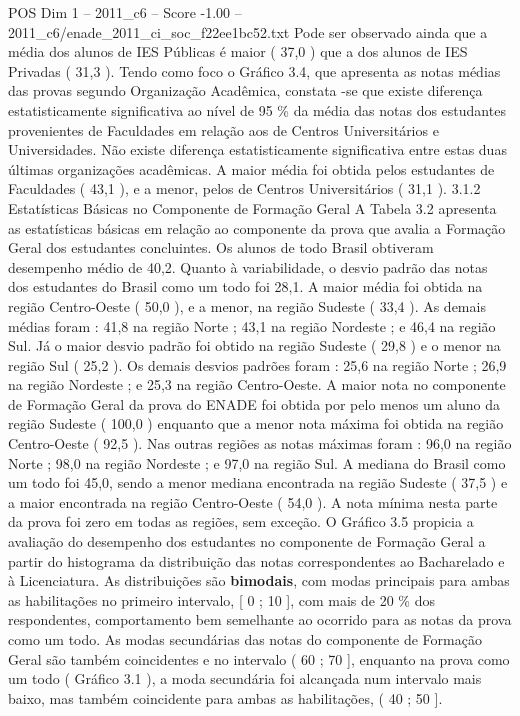 \begin{textsample}{POS Dim 1 – 2011\_c6 – Score -1.00 – 2011\_c6/enade\_2011\_ci\_soc\_f22ee1bc52.txt}
Pode ser observado ainda que a média dos alunos de IES Públicas é maior ( 37,0 ) que a dos alunos de IES Privadas ( 31,3 ).
Tendo como foco o Gráfico 3.4, que apresenta as notas médias das provas segundo Organização Acadêmica, constata -se que existe diferença estatisticamente significativa ao nível de 95 \% da média das notas dos estudantes provenientes de Faculdades em relação aos de Centros Universitários e Universidades.
Não existe diferença estatisticamente significativa entre estas duas últimas organizações acadêmicas.
A maior média foi obtida pelos estudantes de Faculdades ( 43,1 ), e a menor, pelos de Centros Universitários ( 31,1 ). 3.1.2 Estatísticas Básicas no Componente de Formação Geral A Tabela 3.2 apresenta as estatísticas básicas em relação ao componente da prova que avalia a Formação Geral dos estudantes concluintes.
Os alunos de todo Brasil obtiveram desempenho médio de 40,2.
Quanto à variabilidade, o desvio padrão das notas dos estudantes do Brasil como um todo foi 28,1.
A maior média foi obtida na região Centro-Oeste ( 50,0 ), e a menor, na região Sudeste ( 33,4 ).
As demais médias foram : 41,8 na região Norte ; 43,1 na região Nordeste ; e 46,4 na região Sul.
Já o maior desvio padrão foi obtido na região Sudeste ( 29,8 ) e o menor na região Sul ( 25,2 ).
Os demais desvios padrões foram : 25,6 na região Norte ; 26,9 na região Nordeste ; e 25,3 na região Centro-Oeste.
A maior nota no componente de Formação Geral da prova do ENADE foi obtida por pelo menos um aluno da região Sudeste ( 100,0 ) enquanto que a menor nota máxima foi obtida na região Centro-Oeste ( 92,5 ).
Nas outras regiões as notas máximas foram : 96,0 na região Norte ; 98,0 na região Nordeste ; e 97,0 na região Sul.
A mediana do Brasil como um todo foi 45,0, sendo a menor mediana encontrada na região Sudeste ( 37,5 ) e a maior encontrada na região Centro-Oeste ( 54,0 ).
A nota mínima nesta parte da prova foi zero em todas as regiões, sem exceção.
O Gráfico 3.5 propicia a avaliação do desempenho dos estudantes no componente de Formação Geral a partir do histograma da distribuição das notas correspondentes ao Bacharelado e à Licenciatura.
As distribuições são \textbf{bimodais}, com modas principais para ambas as habilitações no primeiro intervalo, [ 0 ; 10 ], com mais de 20 \% dos respondentes, comportamento bem semelhante ao ocorrido para as notas da prova como um todo.
As modas secundárias das notas do componente de Formação Geral são também coincidentes e no intervalo ( 60 ; 70 ], enquanto na prova como um todo ( Gráfico 3.1 ), a moda secundária foi alcançada num intervalo mais baixo, mas também coincidente para ambas as habilitações, ( 40 ; 50 ].

\end{textsample}
